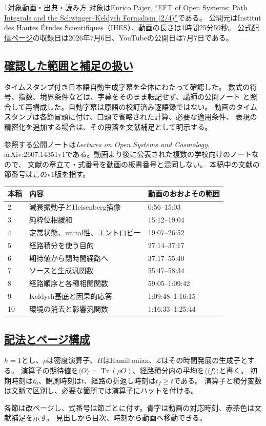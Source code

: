 \documentclass[a4paper,11pt]{ltjsarticle}
\newcommand{\subsectionlink}[1]{\subsection[#1]{\hyperlink{toc}{#1}}}
\numberwithin{equation}{section}
\newcommand{\Tr}{\operatorname{Tr}}
\newcommand{\av}[1]{\langle #1\rangle}
\newcommand{\pav}[1]{\langle\!\langle #1\rangle\!\rangle}
\begin{document}
\begin{lecturesection}{1}{対象動画・出典・読み方}
\label{sec:scope}
対象は\href{https://www.youtube.com/watch?v=RYxzcUhIHjk}{Enrico Pajer, ``EFT of Open Systems:
Path Integrals and the Schwinger--Keldysh Formalism (2/4)''}である。
公開元はInstitut des Hautes Études Scientifiques（IHES）、動画の長さは1時間25分59秒。
\href{https://www.carmin.tv/en/video/eft-of-open-systems-path-integrals-and-the-schwinger-keldysh-formalism-2-4}{公式配信ページ}の収録日は2026年7月6日、YouTubeの公開日は7月7日である。

\subsectionlink{確認した範囲と補足の扱い}
タイムスタンプ付き日本語自動生成字幕を全体にわたって確認した。
数式の符号、指数、境界条件などは、字幕をそのまま転記せず、講師の公開ノート
\cite{Pajer:2026fuo}と照合して再構成した。自動字幕は原語の校訂済み逐語録ではない。
動画のタイムスタンプは各節冒頭に付け、口頭で省略された計算、必要な適用条件、
表現の精密化を追加する場合は、その段落を文献補足として明示する。

参照する公開ノートは\emph{Lectures on Open Systems and Cosmology},
arXiv:2607.14351v1である。動画より後に公表された複数の学校向けのノートなので、
文献の章立て・式番号を動画の板書番号と混同しない。
本稿中の文献の節番号はこのv1版を指す。

\begin{longtable}{@{}p{}p{}p{}@{}}
\toprule 本稿 & 内容 & 動画のおおよその範囲\\\midrule\endhead
2 & 減衰振動子とHeisenberg描像 & 0:56--15:03\\
3 & 純粋位相緩和 & 15:12--19:04\\
4 & 定常状態、unital性、エントロピー & 19:07--26:52\\
5 & 経路積分を使う目的 & 27:14--37:17\\
6 & 期待値から閉時間経路へ & 37:17--55:40\\
7 & ソースと生成汎関数 & 55:47--58:34\\
8 & 経路順序と各種相関関数 & 59:05--1:09:42\\
9 & Keldysh基底と因果的応答 & 1:09:48--1:16:15\\
10 & 環境の消去と影響汎関数 & 1:16:33--1:25:44\\\bottomrule
\end{longtable}

\subsectionlink{記法とページ構成}
$\hbar=1$とし、$\rho$は密度演算子、$H$はHamiltonian、$\mathcal L$はその時間発展の生成子とする。
演算子の期待値を$\av{O}=\Tr(\rho O)$、経路積分内の平均を$\pav{f}$と書く。
初期時刻は$t_0$、観測時刻は$t$、経路の折返し時刻は$t_f\ge t$である。
演算子と積分変数は文脈で区別し、必要な箇所では演算子にハットを付ける。

各節は改ページし、式番号は節ごとに付す。青字は動画の対応時刻、赤茶色は文献補足を示す。
見出しから目次、時刻から動画へ移動できる。
\end{lecturesection}
\end{document}
